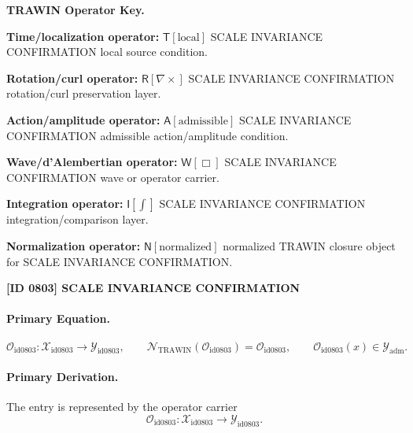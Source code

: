 \par\vspace{0.45\baselineskip}
\noindent\begin{minipage}[t]{\linewidth}
\begingroup
\small
\raggedright
\textbf{TRAWIN Operator Key.}\par
\noindent\textbf{Time/localization operator:} $\mathsf{T}\!\left[\mathrm{local}\right]$ SCALE INVARIANCE CONFIRMATION local source condition.\par
\noindent\textbf{Rotation/curl operator:} $\mathsf{R}\!\left[\nabla\times\right]$ SCALE INVARIANCE CONFIRMATION rotation/curl preservation layer.\par
\noindent\textbf{Action/amplitude operator:} $\mathsf{A}\!\left[\mathrm{admissible}\right]$ SCALE INVARIANCE CONFIRMATION admissible action/amplitude condition.\par
\noindent\textbf{Wave/d'Alembertian operator:} $\mathsf{W}\!\left[\Box\right]$ SCALE INVARIANCE CONFIRMATION wave or operator carrier.\par
\noindent\textbf{Integration operator:} $\mathsf{I}\!\left[\int\right]$ SCALE INVARIANCE CONFIRMATION integration/comparison layer.\par
\noindent\textbf{Normalization operator:} $\mathsf{N}\!\left[\mathrm{normalized}\right]$ normalized TRAWIN closure object for SCALE INVARIANCE CONFIRMATION.\par
\endgroup
\end{minipage}

\clearpage
\noindent\textbf{[ID 0803] SCALE INVARIANCE CONFIRMATION}\par
\vspace{0.35em}
\paragraph{Primary Equation.}
\[
\mathcal{O}_{\mathrm{id0803}}:\mathcal{X}_{\mathrm{id0803}}\longrightarrow \mathcal{Y}_{\mathrm{id0803}},\qquad
\mathcal{N}_{\mathrm{TRAWIN}}(\mathcal{O}_{\mathrm{id0803}})=\mathcal{O}_{\mathrm{id0803}},\qquad
\mathcal{O}_{\mathrm{id0803}}(x)\in\mathcal{Y}_{\mathrm{adm}}.
\]

\paragraph{Primary Derivation.} The entry is represented by the operator carrier\[
\mathcal{O}_{\mathrm{id0803}}:\mathcal{X}_{\mathrm{id0803}}\longrightarrow \mathcal{Y}_{\mathrm{id0803}}.
\]

